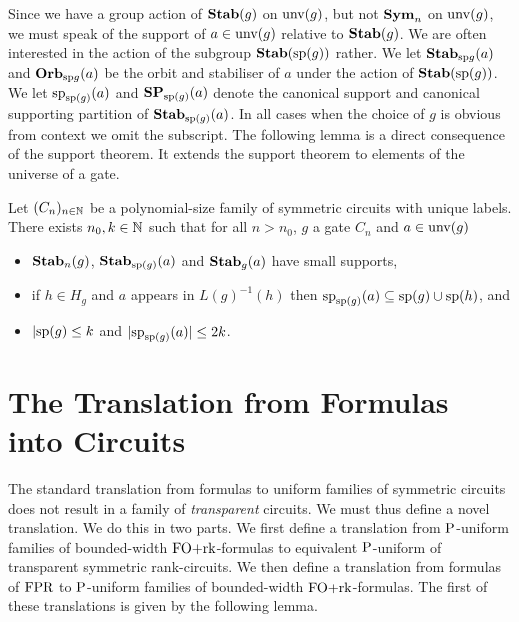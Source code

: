 \documentclass[a4paper,UKenglish]{lipics-v2018}
\begin{document}
Since we have a group action of $\text{\textbf{Stab}}(g)$ on $\text{unv}(g)$, but not $\text{\textbf{Sym}}_n$
on $\text{unv}(g)$, we must speak of the support of $a \in \text{unv}(g)$ relative
to $\text{\textbf{Stab}}(g)$. We are often interested in the action of the subgroup
$\text{\textbf{Stab}} (\text{sp} (g))$ rather. We let $\text{\textbf{Stab}}_{\text{sp}{g}}(a)$ and $\text{\textbf{Orb}}_{\text{sp}{g}}(a)$ be
the orbit and stabiliser of $a$ under the action of $\text{\textbf{Stab}} (\text{sp} (g))$. We let
$\text{sp}_{\text{sp}(g)}(a)$ and $\text{\textbf{SP}}_{\text{sp}(g)}(a)$ denote the canonical support
and canonical supporting partition of $\text{\textbf{Stab}}_{\text{sp}(g)}(a)$. In all cases when
the choice of $g$ is obvious from context we omit the subscript. The following
lemma is a direct consequence of the support theorem. It extends the support
theorem to elements of the universe of a gate.

\begin{lemma}
  \label{lem:row-column-supports}
  Let $(C_n)_{n \in \mathbb{N}}$ be a polynomial-size family of symmetric circuits
  with unique labels. There exists $n_0, k \in \mathbb{N}$ such that for all $n >
  n_0$, $g$ a gate $C_n$ and $a \in \text{unv}(g)$
  \begin{itemize}
  \item $\text{\textbf{Stab}}_n(g)$, $\text{\textbf{Stab}}_{\text{sp}(g)}(a)$ and $\text{\textbf{Stab}}_{g}(a)$ have small
    supports,
  \item if $h \in H_g$ and $a$ appears in $L(g)^{-1}(h)$ then
    $\text{sp}_{\text{sp}(g)}(a) \subseteq \text{sp}(g) \cup \text{sp}(h)$, and
  \item $\vert \text{sp}(g) \leq k$ and $\vert \text{sp}_{\text{sp}(g)}(a) \vert \leq
    2k$.
  \end{itemize}
\end{lemma}


\section{The Translation from Formulas into
  Circuits}\label{sec:formulas-to-circuits}
The standard translation from formulas to uniform families of symmetric circuits
does not result in a family of \emph{transparent} circuits. We must thus define
a novel translation. We do this in two parts. We first define a translation from
$\mathrm{P}$-uniform families of bounded-width $\text{\upshape FO+rk}$-formulas to equivalent
$\mathrm{P}$-uniform of transparent symmetric rank-circuits. We then define a
translation from formulas of $\text{\upshape FPR}$ to $\mathrm{P}$-uniform families of bounded-width
$\text{\upshape FO+rk}$-formulas. The first of these translations is given by the following
lemma.
\end{document}
